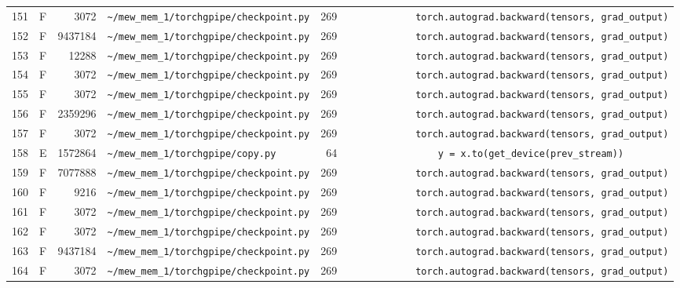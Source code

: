 \documentclass{article}
\begin{document}
\begin{longtable}{r l r p{6.5cm} r p{7.0cm}}
151 & F & 3072 & \lstinline|~/mew_mem_1/torchgpipe/checkpoint.py| & 269 & \lstinline|            torch.autograd.backward(tensors, grad_output)| \\
152 & F & 9437184 & \lstinline|~/mew_mem_1/torchgpipe/checkpoint.py| & 269 & \lstinline|            torch.autograd.backward(tensors, grad_output)| \\
153 & F & 12288 & \lstinline|~/mew_mem_1/torchgpipe/checkpoint.py| & 269 & \lstinline|            torch.autograd.backward(tensors, grad_output)| \\
154 & F & 3072 & \lstinline|~/mew_mem_1/torchgpipe/checkpoint.py| & 269 & \lstinline|            torch.autograd.backward(tensors, grad_output)| \\
155 & F & 3072 & \lstinline|~/mew_mem_1/torchgpipe/checkpoint.py| & 269 & \lstinline|            torch.autograd.backward(tensors, grad_output)| \\
156 & F & 2359296 & \lstinline|~/mew_mem_1/torchgpipe/checkpoint.py| & 269 & \lstinline|            torch.autograd.backward(tensors, grad_output)| \\
157 & F & 3072 & \lstinline|~/mew_mem_1/torchgpipe/checkpoint.py| & 269 & \lstinline|            torch.autograd.backward(tensors, grad_output)| \\
158 & E & 1572864 & \lstinline|~/mew_mem_1/torchgpipe/copy.py| & 64 & \lstinline|                y = x.to(get_device(prev_stream))| \\
159 & F & 7077888 & \lstinline|~/mew_mem_1/torchgpipe/checkpoint.py| & 269 & \lstinline|            torch.autograd.backward(tensors, grad_output)| \\
160 & F & 9216 & \lstinline|~/mew_mem_1/torchgpipe/checkpoint.py| & 269 & \lstinline|            torch.autograd.backward(tensors, grad_output)| \\
161 & F & 3072 & \lstinline|~/mew_mem_1/torchgpipe/checkpoint.py| & 269 & \lstinline|            torch.autograd.backward(tensors, grad_output)| \\
162 & F & 3072 & \lstinline|~/mew_mem_1/torchgpipe/checkpoint.py| & 269 & \lstinline|            torch.autograd.backward(tensors, grad_output)| \\
163 & F & 9437184 & \lstinline|~/mew_mem_1/torchgpipe/checkpoint.py| & 269 & \lstinline|            torch.autograd.backward(tensors, grad_output)| \\
164 & F & 3072 & \lstinline|~/mew_mem_1/torchgpipe/checkpoint.py| & 269 & \lstinline|            torch.autograd.backward(tensors, grad_output)| \\

\end{longtable}
\end{document}
